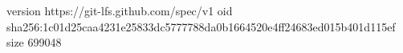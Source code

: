 version https://git-lfs.github.com/spec/v1
oid sha256:1c01d25caa4231e25833dc5777788da0b1664520e4ff24683ed015b401d115ef
size 699048
